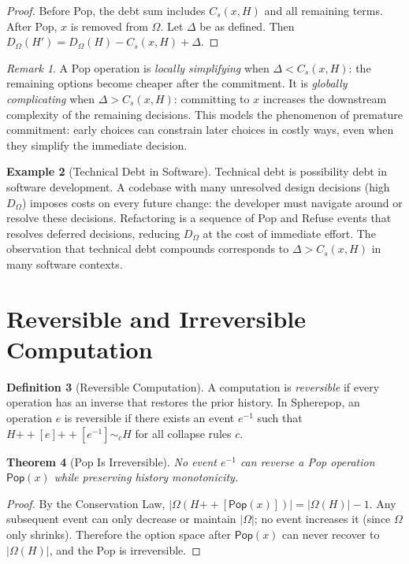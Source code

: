 \documentclass[12pt, a4paper, openany]{book}
\theoremstyle{plain}
\newtheorem{theorem}{Theorem}[chapter]
\theoremstyle{definition}
\newtheorem{definition}[theorem]{Definition}
\newtheorem{example}[theorem]{Example}
\theoremstyle{remark}
\newtheorem{remark}[theorem]{Remark}
\newcommand{\Pop}{\mathsf{Pop}}
\begin{document}
\begin{proof}
Before Pop, the debt sum includes $C_s(x, H)$ and all remaining terms.
After Pop, $x$ is removed from $\Omega$. Let $\Delta$ be as defined.
Then $D_\Omega(H') = D_\Omega(H) - C_s(x, H) + \Delta$.
\end{proof}

\begin{remark}
A Pop operation is \emph{locally simplifying} when $\Delta < C_s(x, H)$: the
remaining options become cheaper after the commitment. It is \emph{globally
complicating} when $\Delta > C_s(x, H)$: committing to $x$ increases the
downstream complexity of the remaining decisions. This models the phenomenon
of premature commitment: early choices can constrain later choices in costly
ways, even when they simplify the immediate decision.
\end{remark}

\begin{example}[Technical Debt in Software]
Technical debt is possibility debt in software development. A codebase with
many unresolved design decisions (high $D_\Omega$) imposes costs on every
future change: the developer must navigate around or resolve these decisions.
Refactoring is a sequence of Pop and Refuse events that resolves deferred
decisions, reducing $D_\Omega$ at the cost of immediate effort. The observation
that technical debt compounds corresponds to $\Delta > C_s(x, H)$ in many
software contexts.
\end{example}

\section{Reversible and Irreversible Computation}

\begin{definition}[Reversible Computation]
A computation is \emph{reversible} if every operation has an inverse that
restores the prior history. In Spherepop, an operation $e$ is reversible if
there exists an event $e^{-1}$ such that
$H \mathbin{++} [e] \mathbin{++} [e^{-1}] \sim_c H$ for all collapse rules $c$.
\end{definition}

\begin{theorem}[Pop Is Irreversible]
No event $e^{-1}$ can reverse a Pop operation $\Pop(x)$ while preserving
history monotonicity.
\end{theorem}

\begin{proof}
By the Conservation Law, $|\Omega(H \mathbin{++} [\Pop(x)])| = |\Omega(H)| - 1$.
Any subsequent event can only decrease or maintain $|\Omega|$; no event increases
it (since $\Omega$ only shrinks). Therefore the option space after $\Pop(x)$
can never recover to $|\Omega(H)|$, and the Pop is irreversible.
\end{proof}
\end{document}
